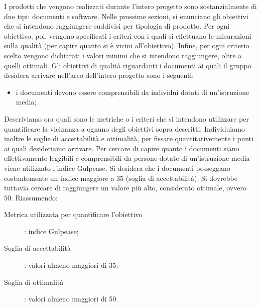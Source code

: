 		  \label{subsec:obiettiviprodotto}
			I prodotti che vengono realizzati durante l'intero progetto sono sostanzialmente di due tipi: documenti e software. Nelle prossime sezioni, si enunciano gli obiettivi che si intendono raggiungere suddivisi per tipologia di prodotto. Per ogni obiettivo, poi, vengono specificati i criteri con i quali si effettuano le misurazioni sulla qualità (per capire quanto si è vicini all'obiettivo). Infine, per ogni criterio scelto vengono dichiarati i valori minimi che si intendono raggiungere, oltre a quelli ottimali.
				Gli obiettivi di qualità riguardanti i documenti ai quali il gruppo \groupname{} desidera arrivare nell'arco dell'intero progetto sono i seguenti:
				\begin{itemize}
					\item i documenti devono essere comprensibili da individui dotati di un'istruzione media;
				\end{itemize}
				Descriviamo ora quali sono le metriche o i criteri che si intendono utilizzare per quantificare la vicinanza a ognuno degli obiettivi sopra descritti. Individuiamo inoltre le soglie di accettabilità e ottimalità, per fissare quantitativemente i punti ai quali desideriamo arrivare.
					Per cercare di capire quanto i documenti siano effettivamente leggibili e comprensibili da persone dotate di un'istruzione media viene utilizzato l'indice Gulpease. Si desidera che i documenti posseggano costantemente un indice maggiore a 35 (soglia di accettabilità). Si dovrebbe tuttavia cercare di raggiungere un valore più alto, considerato ottimale, ovvero 50. Riassumendo:
					\begin{description}
						\item[Metrica utilizzata per quantificare l'obiettivo]: indice Gulpease;
						\item[Soglia di accettabilità]: valori almeno maggiori di 35;
						\item[Soglia di ottimalità]: valori almeno maggiori di 50.
					\end{description}
